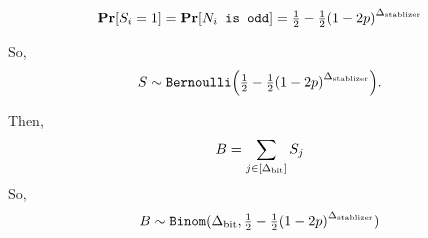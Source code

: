 \newcommand{\SPr}{\half - \half\mleft(1-2p\mright)^\NTQ}
\begin{align*}
	\Pr[S_i = 1] = \Pr\mleft[\texttt{$N_i$ is odd}\mright] = \SPr
\end{align*}

So,
$$
	\syndromeRV \sim \texttt{Bernoulli}\mleft(\SPr\mright).
$$

Then,
$$
	B = \sum_{j \in [{\Delta_{\text{bit}}}]} S_j
$$
So, 
$$
	\bitscoreRV \sim \texttt{Binom}(\NTS, \SPr)
$$


